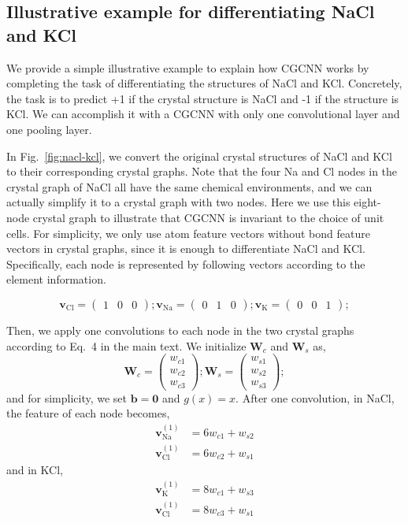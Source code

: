 \documentclass[twocolumn, prl]{revtex4-1}
\begin{document}
\subsection{Illustrative example for differentiating NaCl and KCl}

We provide a simple illustrative example to explain how CGCNN works by completing the task of differentiating the structures of NaCl and KCl. Concretely, the task is to predict +1 if the crystal structure is NaCl and -1 if the structure is KCl. We can accomplish it with a CGCNN with only one convolutional layer and one pooling layer.

In Fig.~\ref{fig:nacl-kcl}, we convert the original crystal structures of NaCl and KCl to their corresponding crystal graphs. Note that the four Na and Cl nodes in the crystal graph of NaCl all have the same chemical environments, and we can actually simplify it to a crystal graph with two nodes. Here we use this eight-node crystal graph to illustrate that CGCNN is invariant to the choice of unit cells. For simplicity, we only use atom feature vectors without bond feature vectors in crystal graphs, since it is enough to differentiate NaCl and KCl. Specifically, each node is represented by following vectors according to the element information.

\begin{equation}
  \bm{v}_{\mathrm{Cl}} = \begin{pmatrix} 1 & 0 & 0 \end{pmatrix};
  \bm{v}_{\mathrm{Na}} = \begin{pmatrix} 0 & 1 & 0 \end{pmatrix};
  \bm{v}_{\mathrm{K}} = \begin{pmatrix} 0 & 0 & 1 \end{pmatrix};
\end{equation}

Then, we apply one convolutions to each node in the two crystal graphs according to Eq.~4 in the main text. We initialize $\bm{W}_c$ and $\bm{W}_s$ as,
\begin{equation}
  \bm{W}_c = \begin{pmatrix} w_{c1} \\ w_{c2} \\ w_{c3} \end{pmatrix};
  \bm{W}_s = \begin{pmatrix} w_{s1} \\ w_{s2} \\ w_{s3} \end{pmatrix};
\end{equation}
and for simplicity, we set $\bm{b} = \bm{0}$ and $g(x) = x$. After one convolution, in NaCl, the feature of each node becomes,
\begin{align}
  \bm{v}_{\mathrm{Na}}^{(1)} &= 6 w_{c1} + w_{s2} \\
  \bm{v}_{\mathrm{Cl}}^{(1)} &= 6 w_{c2} + w_{s1}
\end{align}
and in KCl,
\begin{align}
  \bm{v}_{\mathrm{K}}^{(1)} &= 8 w_{c1} + w_{s3} \\
  \bm{v}_{\mathrm{Cl}}^{(1)} &= 8 w_{c3} + w_{s1}
\end{align}
\end{document}
